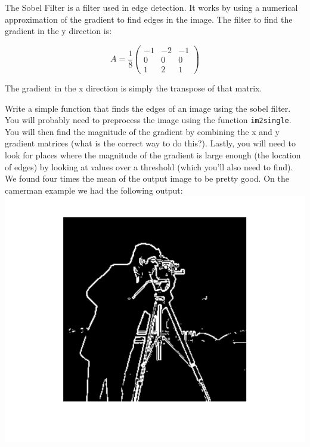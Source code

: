\begin{problem}

The Sobel Filter is a filter used in edge detection. It works by using a numerical approximation of the gradient to find edges in the image. The filter to find the gradient in the y direction is:

\[
A = \frac{1}{8}\begin{pmatrix}
-1&-2&-1\\
0&0&0\\
1&2&1
\end{pmatrix}
\]

The gradient in the x direction is simply the transpose of that matrix.

Write a simple function that finds the edges of an image using the sobel filter. You will probably need to preprocess the image using the function {\tt im2single}. You will then find the magnitude of the gradient by combining the x and y gradient matrices (what is the correct way to do this?). Lastly, you will need to look for places where the magnitude of the gradient is large enough (the location of edges) by looking at values over a threshold (which you'll also need to find). We found four times the mean of the output image to be pretty good. On the camerman example we had the following output:
\includegraphics{edges.pdf}
\end{problem}

